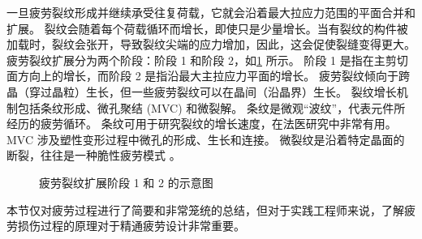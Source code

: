 一旦疲劳裂纹形成并继续承受往复荷载，它就会沿着最大拉应力范围的平面合并和扩展。 裂纹会随着每个荷载循环而增长，即使只是少量增长。当有裂纹的构件被加载时，裂纹会张开，导致裂纹尖端的应力增加，因此，这会促使裂缝变得更大。疲劳裂纹扩展分为两个阶段：阶段 1 和阶段 2，如\cref{fig:crack-growth} 所示。 阶段 1 是指在主剪切面方向上的增长，而阶段 2 是指沿最大主拉应力平面的增长。 疲劳裂纹倾向于跨晶（穿过晶粒）生长，但一些疲劳裂纹可以在晶间（沿晶界）生长。 裂纹增长机制包括条纹形成、微孔聚结 (MVC) 和微裂解。 条纹是微观“波纹”，代表元件所经历的疲劳循环。 条纹可用于研究裂纹的增长速度，在法医研究中非常有用。 MVC 涉及塑性变形过程中微孔的形成、生长和连接。 微裂纹是沿着特定晶面的断裂，往往是一种脆性疲劳模式 \cite{stephens2000m}。

\begin{figure}
  \caption{疲劳裂纹扩展阶段 1 和 2 的示意图\cite{stephens2000m}}
  \label{fig:crack-growth}
\end{figure}

本节仅对疲劳过程进行了简要和非常笼统的总结，但对于实践工程师来说，了解疲劳损伤过程的原理对于精通疲劳设计非常重要。

